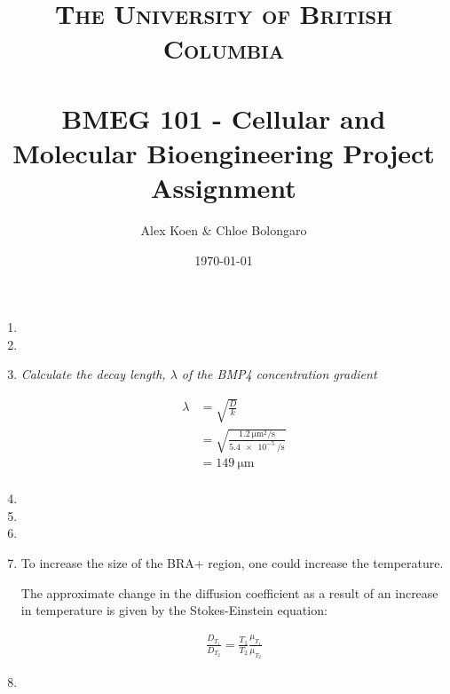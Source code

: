 \documentclass{article} %
\title{
  \normalfont \normalsize
  \textsc{The University of British Columbia} \\ [25pt] %
  \horrule{0.5pt} \\[0.4cm] %
  \huge BMEG 101 - Cellular and Molecular Bioengineering Project Assignment %
  \horrule{2pt} \\[0.5cm] %
}
\author{Alex Koen \& Chloe Bolongaro} %
\date{\normalsize \today} %
\begin{document}
\maketitle %

\onehalfspacing

\begin{enumerate}
    \item 
    \item 
    \item \textit{Calculate the decay length, $\lambda$ of the BMP4 concentration gradient}
    
    \begin{align}
        \lambda &= \sqrt{\frac{D}{k}} \\
        &= \sqrt{\frac{\SI{1.2}{\micro\m^2\per\s}}{\SI{5.4e-5}{\per\s}}} \\
        &= \SI{149}{\micro\m} \\
    \end{align}
    \items
    \item 
    \item
    \item 
    \item To increase the size of the BRA+ region, one could increase the temperature.
    
    The approximate change in the diffusion coefficient as a result of an increase in temperature is given by the Stokes-Einstein equation:
    
    \begin{align}
        \frac{D_{T_1}}{D_{T_2}}=\frac{T_1}{T_2} \frac{\mu_{T_1}}{\mu_{T_2}}
    \end{align}
    \item 
\end{enumerate}
\end{document}
